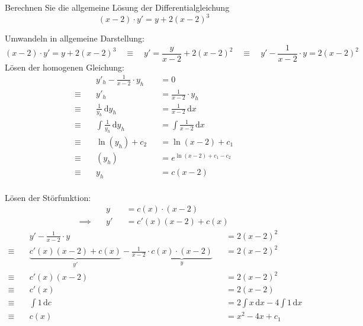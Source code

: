 \documentclass[answers]{exam}
\renewcommand{\d}{\,\mathrm{d}}
\begin{document}
\begin{questions}
    \newpage
    \question
    Berechnen Sie die allgemeine Lösung der Differentialgleichung
    $$
        (x-2) \cdot y' = y + 2(x-2)^3
    $$
    \begin{solution}
        Umwandeln in allgemeine Darstellung:
        $$
            (x-2) \cdot y' = y + 2(x-2)^3 \quad \equiv \quad y' = \frac{y}{x-2} + 2(x-2)^2 \quad \equiv \quad y' - \frac{1}{x-2}\cdot y = 2(x-2)^2
        $$
        Lösen der homogenen Gleichung:
        $$
            \begin{aligned}
                             & y'_h - \frac{1}{x-2}\cdot y_h &  & = 0                         \\
                \equiv \quad & y'_h                          &  & = \frac{1}{x-2}\cdot y_h    \\
                \equiv \quad & \frac{1}{y_h} \d y_h          &  & = \frac{1}{x-2}\d x         \\
                \equiv \quad & \int \frac{1}{y_h} \d y_h     &  & = \int \frac{1}{x-2}\d x    \\
                \equiv \quad & \ln(y_h) + c_2                &  & = \ln (x-2) + c_1           \\
                \equiv \quad & (y_h)                         &  & = e^{\ln (x-2) + c_1 - c_2} \\
                \equiv \quad & y_h                           &  & = c(x-2)                    \\
            \end{aligned}
        $$

        Lösen der Störfunktion:
        $$
            \begin{aligned}
                               & y  &  & = c(x) \cdot (x-2)  \\
                \implies \quad & y' &  & = c'(x)(x-2) + c(x)
            \end{aligned}
        $$
        $$
            \begin{aligned}
                             & y' - \frac{1}{x-2}\cdot y                                                                  &  & = 2(x-2)^2                   \\
                \equiv \quad & \underbrace{c'(x)(x-2) + c(x)}_{y'} - \frac{1}{x-2}\cdot \underbrace{c(x) \cdot (x-2)}_{y} &  & = 2(x-2)^2                   \\
                \equiv \quad & c'(x)(x-2)                                                                                 &  & = 2(x-2)^2                   \\
                \equiv \quad & c'(x)                                                                                      &  & = 2(x-2)                     \\
                \equiv \quad & \int 1 \d c                                                                                &  & = 2\int x\d x - 4\int 1 \d x \\
                \equiv \quad & c(x)                                                                                       &  & = x^2 - 4x + c_1
            \end{aligned}
        $$


\end{solution}
\end{questions}
\end{document}
